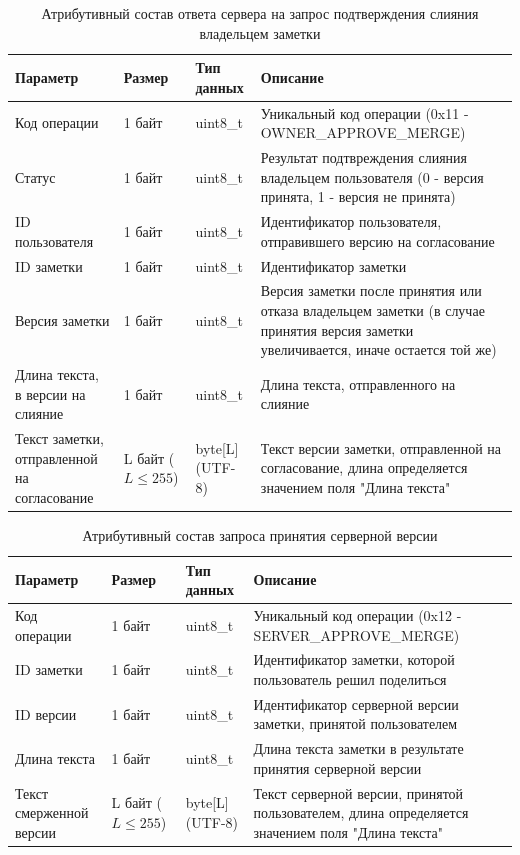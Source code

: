 \begin{table}[H]
    \centering
    \caption{Атрибутивный состав ответа сервера на запрос подтверждения слияния владельцем заметки}
    \renewcommand{\arraystretch}{1.2}
    \begin{tabular}{|p{4cm}|p{2cm}|p{3cm}|p{6cm}|}
    \hline
    \textbf{Параметр} & \textbf{Размер} & \textbf{Тип данных} & \textbf{Описание} \\ \hline
    Код операции & 1 байт & uint8\_t & Уникальный код операции (0x11 - OWNER\_APPROVE\_MERGE) \\ \hline
    Статус & 1 байт & uint8\_t & Результат подтвреждения слияния владельцем пользователя (0 - версия принята, 1 - версия не принята) \\ \hline
    ID пользователя & 1 байт & uint8\_t & Идентификатор пользователя, отправившего версию на согласование \\ \hline
    ID заметки & 1 байт & uint8\_t & Идентификатор заметки \\ \hline
    Версия заметки & 1 байт & uint8\_t & Версия заметки после принятия или отказа владельцем заметки (в случае принятия версия заметки увеличивается, иначе остается той же) \\ \hline
    Длина текста, в версии на слияние & 1 байт & uint8\_t & Длина текста, отправленного на слияние \\ \hline
    Текст заметки, отправленной на согласование & L байт (\(L \le 255\)) & byte[L] (UTF-8) & Текст версии заметки, отправленной на согласование, длина определяется значением поля "Длина текста" \\ \hline
    \end{tabular}
    \label{tab:note_create_response_min}
\end{table}



\begin{table}[H]
    \centering
    \caption{Атрибутивный состав запроса принятия серверной версии}
    \begin{tabular}{|p{4cm}|p{2cm}|p{3cm}|p{6cm}|}
    \hline
    \textbf{Параметр} & \textbf{Размер} & \textbf{Тип данных} & \textbf{Описание} \\ \hline
    Код операции & 1 байт & uint8\_t & Уникальный код операции (0x12 - SERVER\_APPROVE\_MERGE) \\ \hline
    ID заметки & 1 байт & uint8\_t & Идентификатор заметки, которой пользователь решил поделиться \\ \hline
    ID версии & 1 байт & uint8\_t & Идентификатор серверной версии заметки, принятой пользователем \\ \hline
    Длина текста & 1 байт & uint8\_t & Длина текста заметки в результате принятия серверной версии \\ \hline
    Текст смерженной версии & L байт (\(L \le 255\)) & byte[L] (UTF-8) & Текст серверной версии, принятой пользователем, длина определяется значением поля "Длина текста" \\ \hline
    \end{tabular}
    \label{tab:note_create_request}
\end{table}



